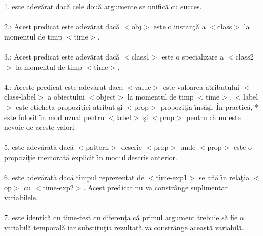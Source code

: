 \documentclass{article}
\begin{document}
{\footnotesize
1.\hspace{10}{\tt(= <arg1> <arg2>)} este adev\u{a}rat dac\u{a} cele dou\u{a} argumente
se unific\u{a} cu succes.
\\ \\
2.\hspace{10}{\tt(instance-of <obj> <class> <time>)}: Acest predicat este adev\u{a}rat
dac\u{a} $<$obj$>$ este o instan\c{t}\u{a} a $<$class$>$ la momentul de timp $<$time$>$.
\\ \\
3.\hspace{10}{\tt(is-a <class1> <class2> <time>)}: Acest predicat este adev\u{a}rat
dac\u{a} $<$class1$>$ este o specializare a $<$class2$>$ la momentul de timp $<$time$>$.
\\ \\
4.\hspace{10}{\tt(attr <obj> <label> <class-label> <value> <prop> <time>)}: Aceste predicat
este \linebreak adev\u{a}rat dac\u{a} $<$value$>$ este valoarea atributului $<$class-label$>$
a obiectului $<$object$>$ la momentul de timp $<$time$>$. $<$label$>$ este eticheta propozi\c{t}iei
atribut \c{s}i $<$prop$>$ propozi\c{t}ia \^{\i}ns\u{a}\c{s}i. \^{I}n practic\u{a}, * este
folosit \^{\i}n mod uzual pentru $<$label$>$ \c{s}i $<$prop$>$ pentru c\u{a} nu este nevoie
de aceste valori.
\\ \\
5.\hspace{10}{\tt(find-prop <pattern> <prop>)} este adev\u{a}rat\u{a} dac\u{a} $<$pattern$>$
descrie $<$prop$>$ unde $<$prop$>$ este o propozi\c{t}ie memorat\u{a} explicit \^{\i}n modul
descris anterior.
\\ \\
6.\hspace{10}{\tt(time-test <time-exp1> <op> <time-exp2>)} este adev\u{a}rat\u{a} dac\u{a} timpul
reprezentat de $<$time-exp1$>$ se afl\u{a} \^{\i}n rela\c{t}ia $<$op$>$ cu $<$time-exp2$>$.
Acest predicat nu va constr\^{a}nge suplimentar variabilele.
\\ \\
7.\hspace{10}{\tt(time-constrain <time-var1> <op> <time-exp2>)} este identic\u{a} cu time-test
cu diferen\c{t}a c\u{a} primul argument trebuie s\u{a} fie o variabil\u{a} temporal\u{a}
iar substitu\c{t}ia rezultat\u{a} va constr\^{a}nge aceast\u{a} variabil\u{a}.
\\ \\
}
\end{document}
